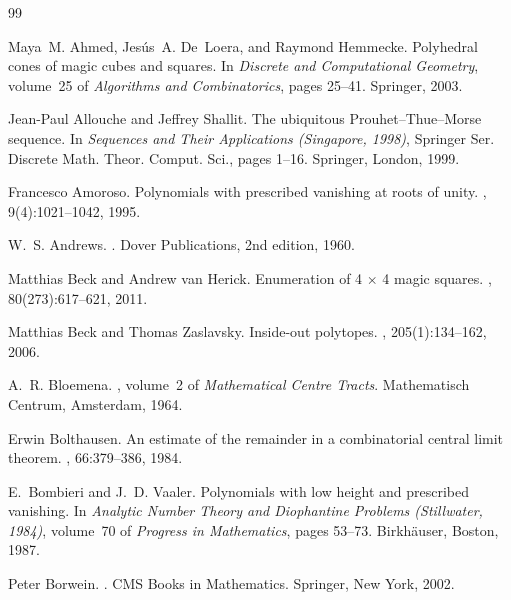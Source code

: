 \documentclass[11pt,a4paper]{article}
\theoremstyle{plain}
\theoremstyle{definition}
\theoremstyle{remark}
\begin{document}
\begin{thebibliography}{99}

Maya~M. Ahmed, Jes{\'u}s~A. De~Loera, and Raymond Hemmecke.
\newblock Polyhedral cones of magic cubes and squares.
\newblock In {\em Discrete and Computational Geometry}, volume~25 of {\em
  Algorithms and Combinatorics}, pages 25--41. Springer, 2003.

Jean-Paul Allouche and Jeffrey Shallit.
\newblock The ubiquitous {P}rouhet--{T}hue--{M}orse sequence.
\newblock In {\em Sequences and Their Applications (Singapore, 1998)}, Springer
  Ser. Discrete Math. Theor. Comput. Sci., pages 1--16. Springer, London, 1999.

Francesco Amoroso.
\newblock Polynomials with prescribed vanishing at roots of unity.
,
  9(4):1021--1042, 1995.

W.~S. Andrews.
.
\newblock Dover Publications, 2nd edition, 1960.

Matthias Beck and Andrew van Herick.
\newblock Enumeration of 4 $\times$ 4 magic squares.
, 80(273):617--621, 2011.

Matthias Beck and Thomas Zaslavsky.
\newblock Inside-out polytopes.
, 205(1):134--162, 2006.

A.~R. Bloemena.
, volume~2 of {\em Mathematical Centre
  Tracts}.
\newblock Mathematisch Centrum, Amsterdam, 1964.

Erwin Bolthausen.
\newblock An estimate of the remainder in a combinatorial central limit
  theorem.
, 66:379--386, 1984.

E.~Bombieri and J.~D. Vaaler.
\newblock Polynomials with low height and prescribed vanishing.
\newblock In {\em Analytic Number Theory and Diophantine Problems (Stillwater,
  1984)}, volume~70 of {\em Progress in Mathematics}, pages 53--73.
  Birkh{\"a}user, Boston, 1987.

Peter Borwein.
.
\newblock CMS Books in Mathematics. Springer, New York, 2002.


\end{thebibliography}
\end{document}
